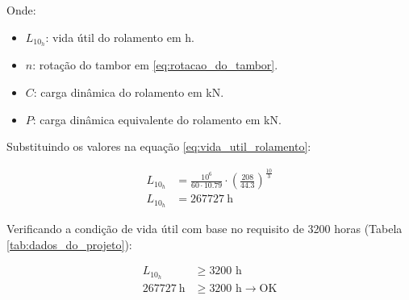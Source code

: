 Onde:

\begin{itemize}
  \item $L_{10_h}$: vida útil do rolamento em \si{\hour}.
  \item $n$: rotação do tambor em \si{\rpm} \eqref{eq:rotacao_do_tambor}.
  \item $C$: carga dinâmica do rolamento em \si{\kilo\newton}.
  \item $P$: carga dinâmica equivalente do rolamento em \si{\kilo\newton}.
\end{itemize}

Substituindo os valores na equação \ref{eq:vida_util_rolamento}:

\begin{align*}
  L_{10_h} & = \frac{10^6}{60 \cdot \num{10.79}} \cdot \left( \frac{\num{208}}{\num{44.3}} \right)^{\frac{10}{3}} \\
  L_{10_h} & = \boxed{\SI{267727}{\hour}}
\end{align*}

Verificando a condição de vida útil com base no requisito de 3200 horas (Tabela \ref{tab:dados_do_projeto}):

\begin{align*}
  L_{10_h}           & \geq 3200 \text{ h}                       \\
  \SI{267727}{\hour} & \geq 3200 \text{ h} \rightarrow \text{OK}
\end{align*}
